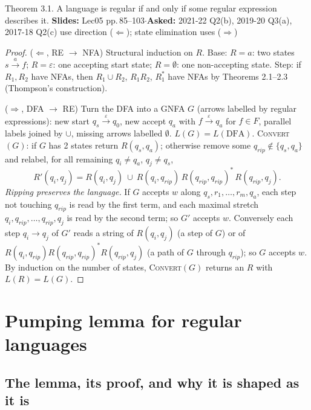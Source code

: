 \documentclass[10.5pt,a4paper]{article}
\newcommand{\src}[2]{{\footnotesize\color{gray!70!black}\textbf{Slides:} #1\enspace$\cdot$\enspace\textbf{Asked:} #2}\par}
\newcommand{\eps}{\varepsilon}
\begin{document}
\begin{thm}{Theorem 3.1. A language is regular if and only if some regular expression describes it.}
\src{Lec05 pp.\,85--103}{2021-22 Q2(b), 2019-20 Q3(a), 2017-18 Q2(c) use direction ($\Leftarrow$); state elimination uses ($\Rightarrow$)}
\end{thm}
\begin{proof}
($\Leftarrow$, RE $\to$ NFA) Structural induction on $R$.
Base: $R=a$: two states $s\xrightarrow{a}f$; $R=\eps$: one accepting start state; $R=\emptyset$: one non-accepting state.
Step: if $R_1,R_2$ have NFAs, then $R_1\cup R_2$, $R_1R_2$, $R_1^*$ have NFAs by Theorems 2.1--2.3 (Thompson's construction).

($\Rightarrow$, DFA $\to$ RE) Turn the DFA into a GNFA $G$ (arrows labelled by regular expressions): new start $q_s\xrightarrow{\eps}q_0$, new
accept $q_a$ with $f\xrightarrow{\eps}q_a$ for $f\in F$, parallel labels joined by $\cup$, missing arrows labelled $\emptyset$.
$L(G)=L(\text{DFA})$. \textsc{Convert}$(G)$: if $G$ has 2 states return $R(q_s,q_a)$; otherwise remove some $q_{rip}\notin\{q_s,q_a\}$ and
relabel, for all remaining $q_i\ne q_a$, $q_j\ne q_s$,
\[R'(q_i,q_j)=R(q_i,q_j)\ \cup\ R(q_i,q_{rip})\,R(q_{rip},q_{rip})^*\,R(q_{rip},q_j).\]
\emph{Ripping preserves the language.} If $G$ accepts $w$ along $q_s,r_1,\dots,r_m,q_a$, each step not touching $q_{rip}$ is read by the
first term, and each maximal stretch $q_i,q_{rip},\dots,q_{rip},q_j$ is read by the second term; so $G'$ accepts $w$. Conversely each step
$q_i\to q_j$ of $G'$ reads a string of $R(q_i,q_j)$ (a step of $G$) or of $R(q_i,q_{rip})R(q_{rip},q_{rip})^*R(q_{rip},q_j)$ (a path of $G$
through $q_{rip}$); so $G$ accepts $w$. By induction on the number of states, \textsc{Convert}$(G)$ returns an $R$ with
$L(R)=L(G)$.
\end{proof}

\section{Pumping lemma for regular languages}

\subsection{The lemma, its proof, and why it is shaped as it is}
\end{document}
